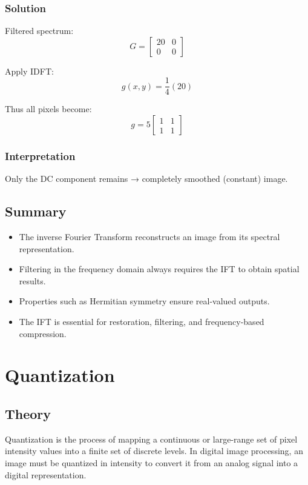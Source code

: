 \documentclass{AnantDocumentation}
\begin{document}
\subsubsection*{Solution}

Filtered spectrum:
\[
G =
\begin{bmatrix}
20 & 0\\
0 & 0
\end{bmatrix}
\]

Apply IDFT:
\[
g(x,y) = \frac{1}{4} ( 20 )
\]

Thus all pixels become:
\[
g = 5
\begin{bmatrix}
1 & 1\\
1 & 1
\end{bmatrix}
\]

\subsubsection*{Interpretation}
Only the DC component remains → completely smoothed (constant) image.

\subsection{Summary}

\begin{itemize}
\item The inverse Fourier Transform reconstructs an image from its spectral representation.
\item Filtering in the frequency domain always requires the IFT to obtain spatial results.
\item Properties such as Hermitian symmetry ensure real-valued outputs.
\item The IFT is essential for restoration, filtering, and frequency-based compression.
\end{itemize}

\section{Quantization}

\subsection{Theory}

Quantization is the process of mapping a continuous or large-range set of pixel intensity values into a finite set of discrete levels.  
In digital image processing, an image must be quantized in intensity to convert it from an analog signal into a digital representation.
\end{document}
